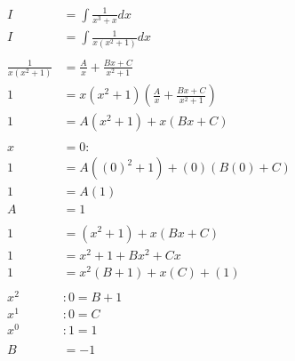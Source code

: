 \documentclass[12pt]{article}
\begin{document}
\begin{align}
    I                  & = \int \frac{1}{x^3+x} dx                                 \\
    I                  & = \int \frac{1}{x(x^2+1)} dx                              \\
    \nonumber                                                                      \\
    \frac{1}{x(x^2+1)} & = \frac{A}{x} + \frac{Bx+C}{x^2+1}                        \\
    1                  & = x(x^2+1)\left(\frac{A}{x} + \frac{Bx+C}{x^2+1}\right)   \\
    1                  & = A(x^2+1) + x(Bx+C)                                      \\
    \nonumber                                                                      \\
    x                  & = 0:                                                      \\
    1                  & = A((0)^2+1) + (0)(B(0)+C)                                \\
    1                  & = A(1)                                                    \\
    A                  & = 1                                                       \\
    \nonumber                                                                      \\
    1                  & = (x^2+1) + x(Bx+C)                                       \\
    1                  & = x^2+1 + Bx^2 + Cx                                       \\
    1                  & = x^2(B+1) + x(C) + (1)                                   \\
    \nonumber                                                                      \\
    x^2                & : 0=B+1                                                   \\
    x^1                & : 0=C                                                     \\
    x^0                & : 1=1                                                     \\
    \nonumber                                                                      \\
    B                  & = -1                                                      \\

\end{align}
\end{document}
